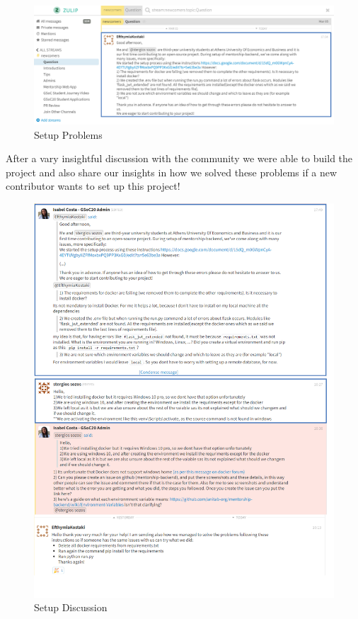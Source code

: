 \documentclass{article}
\begin{document}
\begin{figure}[tph!]
\centerline{\includegraphics[totalheight=8cm, width=18cm]{Setup-problems.png}}
    \caption{Setup Problems}
    \label{fig:verticalcell}
\end{figure}

After a vary insightful discussion with the community we were able to build the project and also share our insights in how we solved these problems if a new contributor wants to set up this project!
\begin{figure}[tph!]
\centerline{\includegraphics[totalheight=16cm, width=16cm]{Setup-discussion.png}}
    \caption{Setup Discussion}
    \label{fig:verticalcell}
\end{figure}
\end{document}
